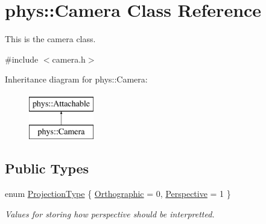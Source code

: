 \hypertarget{classphys_1_1Camera}{
\section{phys::Camera Class Reference}
\label{d9/df8/classphys_1_1Camera}
}


This is the camera class.  




{\ttfamily \#include $<$camera.h$>$}

Inheritance diagram for phys::Camera:\begin{figure}[H]
\begin{center}
\leavevmode
\includegraphics[height=2.000000cm]{d9/df8/classphys_1_1Camera}
\end{center}
\end{figure}
\subsection*{Public Types}
\begin{DoxyCompactItemize}
\item 
enum \hyperlink{classphys_1_1Camera_a87d8d46e9eb2080b10712079be69d86a}{ProjectionType} \{ \hyperlink{classphys_1_1Camera_a87d8d46e9eb2080b10712079be69d86aa6a71e6ab2139c8fc4d48d64aa9717f02}{Orthographic} =  0, 
\hyperlink{classphys_1_1Camera_a87d8d46e9eb2080b10712079be69d86aacfe21986c8c655b8d19ebd76118de055}{Perspective} =  1
 \}
\begin{DoxyCompactList}\small\item\em Values for storing how perspective should be interpretted. \item\end{DoxyCompactList}\end{DoxyCompactItemize}

